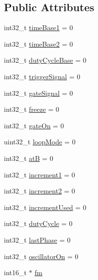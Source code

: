 \subsection*{Public Attributes}
\begin{DoxyCompactItemize}
\item 
int32\+\_\+t \mbox{\hyperlink{class_meta_controller_a1483db6d13fcdfe1bd95fbf93ca3326e}{time\+Base1}} = 0
\item 
int32\+\_\+t \mbox{\hyperlink{class_meta_controller_ac5c0483ea2ebb1eb10bfea59f10bdcda}{time\+Base2}} = 0
\item 
int32\+\_\+t \mbox{\hyperlink{class_meta_controller_ac59400b4de40c7cf7e04f51162cd270b}{duty\+Cycle\+Base}} = 0
\item 
int32\+\_\+t \mbox{\hyperlink{class_meta_controller_ac38144448ad067233f55c7902dea1295}{trigger\+Signal}} = 0
\item 
int32\+\_\+t \mbox{\hyperlink{class_meta_controller_ac1119da420cd861668836ad8e0377511}{gate\+Signal}} = 0
\item 
int32\+\_\+t \mbox{\hyperlink{class_meta_controller_aeedbf9351f89858e25f85ab7652f0ac9}{freeze}} = 0
\item 
int32\+\_\+t \mbox{\hyperlink{class_meta_controller_a43d2de121185a3ed58636a0b1b30035d}{gate\+On}} = 0
\item 
uint32\+\_\+t \mbox{\hyperlink{class_meta_controller_a0bf67d9b21bc680e8d9b1da00775d82e}{loop\+Mode}} = 0
\item 
int32\+\_\+t \mbox{\hyperlink{class_meta_controller_a4e7438588ed111de3739188278576b38}{atB}} = 0
\item 
int32\+\_\+t \mbox{\hyperlink{class_meta_controller_a7d5b47c8cd4550e7adfa219173345ea0}{increment1}} = 0
\item 
int32\+\_\+t \mbox{\hyperlink{class_meta_controller_a3f42cf7429ea0da667b46b973484fc16}{increment2}} = 0
\item 
int32\+\_\+t \mbox{\hyperlink{class_meta_controller_a0f9a8717d45e65cfad651af960c80109}{increment\+Used}} = 0
\item 
int32\+\_\+t \mbox{\hyperlink{class_meta_controller_a695d6b40b4a97789320e097267272840}{duty\+Cycle}} = 0
\item 
int32\+\_\+t \mbox{\hyperlink{class_meta_controller_aee346cae981fdd59a39fcb5911f4e2ef}{last\+Phase}} = 0
\item 
int32\+\_\+t \mbox{\hyperlink{class_meta_controller_a5fd35122564a177ec064c87fdb5dd218}{oscillator\+On}} = 0
\item 
int16\+\_\+t $\ast$ \mbox{\hyperlink{class_meta_controller_a0baa5897d4b06f0e922d96cda137f6ab}{fm}}

\end{DoxyCompactItemize}
